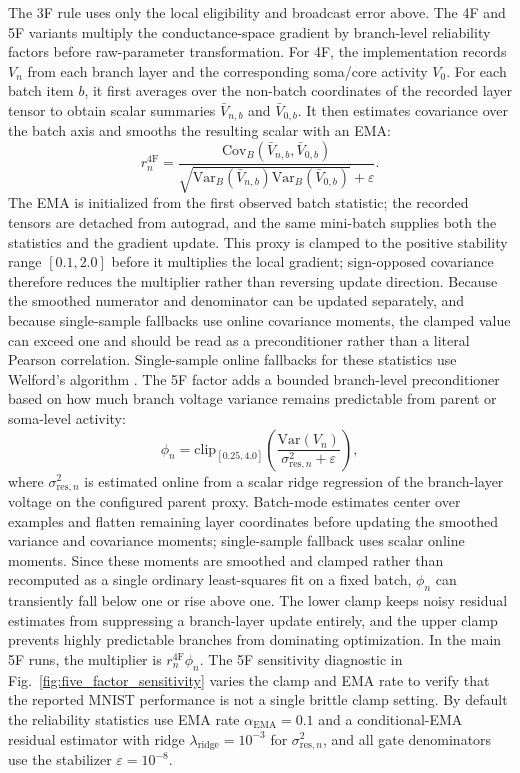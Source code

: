     The 3F rule uses only the local eligibility and broadcast error above. The 4F and 5F variants multiply the conductance-space gradient by branch-level reliability factors before raw-parameter transformation. For 4F, the implementation records $V_n$ from each branch layer and the corresponding soma/core activity $V_0$. For each batch item $b$, it first averages over the non-batch coordinates of the recorded layer tensor to obtain scalar summaries $\bar V_{n,b}$ and $\bar V_{0,b}$. It then estimates covariance over the batch axis and smooths the resulting scalar with an EMA:
    \[
    r_n^{\mathrm{4F}}=
    \frac{\mathrm{Cov}_B(\bar{V}_{n,b},\bar{V}_{0,b})}
    {\sqrt{\mathrm{Var}_B(\bar{V}_{n,b})\mathrm{Var}_B(\bar{V}_{0,b})}+\varepsilon}.
    \]
    The EMA is initialized from the first observed batch statistic; the recorded tensors are detached from autograd, and the same mini-batch supplies both the statistics and the gradient update. This proxy is clamped to the positive stability range $[0.1,2.0]$ before it multiplies the local gradient; sign-opposed covariance therefore reduces the multiplier rather than reversing update direction. Because the smoothed numerator and denominator can be updated separately, and because single-sample fallbacks use online covariance moments, the clamped value can exceed one and should be read as a preconditioner rather than a literal Pearson correlation. Single-sample online fallbacks for these statistics use Welford's algorithm \cite{welford1962note}.
    The 5F factor adds a bounded branch-level preconditioner based on how much branch voltage variance remains predictable from parent or soma-level activity:
    \[
    \phi_n=
    \mathrm{clip}_{[0.25,4.0]}
    \left(
    \frac{\mathrm{Var}(V_n)}
    {\sigma_{\mathrm{res},n}^{2}+\varepsilon}
    \right),
    \]
    where $\sigma_{\mathrm{res},n}^{2}$ is estimated online from a scalar ridge regression of the branch-layer voltage on the configured parent proxy. Batch-mode estimates center over examples and flatten remaining layer coordinates before updating the smoothed variance and covariance moments; single-sample fallback uses scalar online moments. Since these moments are smoothed and clamped rather than recomputed as a single ordinary least-squares fit on a fixed batch, $\phi_n$ can transiently fall below one or rise above one. The lower clamp keeps noisy residual estimates from suppressing a branch-layer update entirely, and the upper clamp prevents highly predictable branches from dominating optimization. In the main 5F runs, the multiplier is $r_n^{\mathrm{4F}}\phi_n$. The 5F sensitivity diagnostic in Fig.~\ref{fig:five_factor_sensitivity} varies the clamp and EMA rate to verify that the reported MNIST performance is not a single brittle clamp setting. By default the reliability statistics use EMA rate $\alpha_{\mathrm{EMA}}=0.1$ and a conditional-EMA residual estimator with ridge $\lambda_{\mathrm{ridge}}=10^{-3}$ for $\sigma_{\mathrm{res},n}^{2}$, and all gate denominators use the stabilizer $\varepsilon=10^{-8}$.
    
